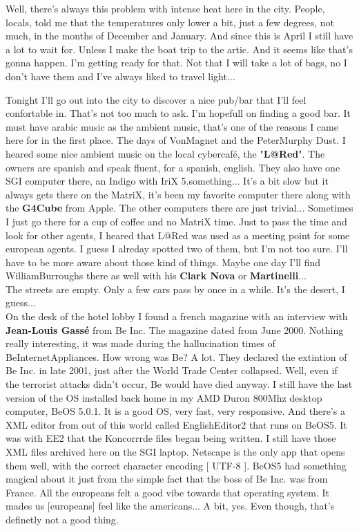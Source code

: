 \documentclass[11pt,twoside,a4paper]{book}
\begin{document}
\begin{multicols*}{2}
Well, there's always this problem with intense heat here in the city. People, locals, told me that the temperatures only lower a bit, just a few degrees, not much, in the months of December and January. And since this is April I still have a lot to wait for. Unless I make the boat trip to the artic. And it seems like that's gonna happen. I'm getting ready for that. Not that I will take a lot of bags, no I don't have them and I've always liked to travel light... %

Tonight I'll go out into the city to discover a nice pub/bar that I'll feel confortable in. That's not too much to ask. I'm hopefull on finding a good bar. It must have arabic music as the ambient music, that's one of the reasons I came here for in the first place. The days of VonMagnet and the PeterMurphy Dust. I heared some nice ambient music on the local cybercaf{\'e}, the "\textbf{L@Red}". The owners are spanish and speak fluent, for a spanish, english. They also have one SGI computer there, an Indigo with IriX 5.something... It's a bit slow but it always gets there on the MatriX, it's been my favorite computer there along with the \textbf{G4Cube} from Apple. The other computers there are just trivial... Sometimes I just go there for a cup of coffee and no MatriX time. Just to pass the time and look for other agents, I heared that L@Red was used as a meeting point for some european agents. I guess I alreday spotted two of them, but I'm not too sure. I'll have to be more aware about those kind of things. Maybe one day I'll find WilliamBurroughs there as well with his \textbf{Clark Nova} or \textbf{Martinelli}... ~\\

The streets are empty. Only a few cars pass by once in a while. It's the desert, I guess... ~\\

On the desk of the hotel lobby I found a french magazine with an interview with \textbf{Jean-Louis Gass{\'e}} from Be Inc. The magazine dated from June 2000. Nothing really interesting, it was made during the hallucination times of BeInternetAppliances. How wrong was Be? A lot. They declared the extintion of Be Inc. in late 2001, just after the World Trade Center collapsed. Well, even if the terrorist attacks didn't occur, Be would have died anyway. I still have the last version of the OS installed back home in my AMD Duron 800Mhz desktop computer, BeOS 5.0.1. It is a good OS, very fast, very responsive. And there's a XML editor from out of this world called EnglishEditor2 that runs on BeOS5. It was with EE2 that the Koncorrrde files began being written. I still have those XML files archived here on the SGI laptop. Netscape is the only app that opens them well, with the correct character encoding [ UTF-8 ]. BeOS5 had something magical about it just from the simple fact that the boss of Be Inc. was from France. All the europeans felt a good vibe towards that operating system. It mades us [europeans] feel like the americans... A bit, yes. Even though, that's definetly not a good thing. ~\\


\end{multicols*}
\end{document}

